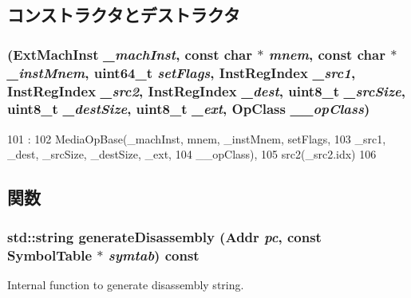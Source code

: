 \subsection{コンストラクタとデストラクタ}
\hypertarget{classX86ISA_1_1MediaOpReg_ab20ae387d3347d43b4fb4ed2171e527d}{
\subsubsection[{MediaOpReg}]{ ({\bf ExtMachInst} {\em \_\-machInst}, \/  const char $\ast$ {\em mnem}, \/  const char $\ast$ {\em \_\-instMnem}, \/  uint64\_\-t {\em setFlags}, \/  {\bf InstRegIndex} {\em \_\-src1}, \/  {\bf InstRegIndex} {\em \_\-src2}, \/  {\bf InstRegIndex} {\em \_\-dest}, \/  uint8\_\-t {\em \_\-srcSize}, \/  uint8\_\-t {\em \_\-destSize}, \/  uint8\_\-t {\em \_\-ext}, \/  OpClass {\em \_\-\_\-opClass})}}
\label{classX86ISA_1_1MediaOpReg_ab20ae387d3347d43b4fb4ed2171e527d}



\begin{DoxyCode}
101                                    :
102             MediaOpBase(_machInst, mnem, _instMnem, setFlags,
103                     _src1, _dest, _srcSize, _destSize, _ext,
104                     __opClass),
105             src2(_src2.idx)
106         {}

\end{DoxyCode}


\subsection{関数}
\hypertarget{classX86ISA_1_1MediaOpReg_a95d323a22a5f07e14d6b4c9385a91896}{
\subsubsection[{generateDisassembly}]{\setlength{\rightskip}{0pt plus 5cm}std::string generateDisassembly ({\bf Addr} {\em pc}, \/  const {\bf SymbolTable} $\ast$ {\em symtab}) const}}
\label{classX86ISA_1_1MediaOpReg_a95d323a22a5f07e14d6b4c9385a91896}
Internal function to generate disassembly string. 

